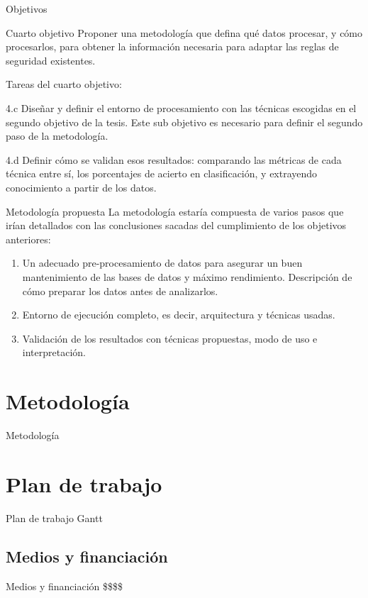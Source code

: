 \documentclass{beamer}
\begin{document}
\begin{frame}{Objetivos}

\begin{block}{Cuarto objetivo}
Proponer una metodología que defina qué datos procesar, y cómo procesarlos, para obtener la información necesaria para adaptar las reglas de seguridad existentes.
\end{block}

Tareas del cuarto objetivo:

\begin{description}
  \begin{small}
  \item[4.c] Diseñar y definir el entorno de procesamiento con las técnicas escogidas en el segundo objetivo de la tesis. Este sub objetivo es necesario para definir el segundo paso de la metodología.
  \item[4.d] Definir cómo se validan esos resultados: comparando las métricas de cada técnica entre sí, los porcentajes de acierto en clasificación, y extrayendo conocimiento a partir de los datos.
  \end{small}
\end{description}

\end{frame}

\begin{frame}{Metodología propuesta}
La metodología estaría compuesta de varios pasos que irían detallados con las conclusiones sacadas del cumplimiento de los objetivos anteriores:

\begin{enumerate}
  \item Un adecuado pre-procesamiento de datos para asegurar un buen mantenimiento de las bases de datos y máximo rendimiento. Descripción de cómo preparar los datos antes de analizarlos.
  \item Entorno de ejecución completo, es decir, arquitectura y técnicas usadas.
  \item Validación de los resultados con técnicas propuestas, modo de uso e interpretación.
\end{enumerate}

\end{frame}

\section{Metodología}

\begin{frame}{Metodología}

\end{frame}

\section{Plan de trabajo}

\begin{frame}{Plan de trabajo}
Gantt
\end{frame}

\subsection{Medios y financiación}

\begin{frame}{Medios y financiación}
\$\$\$\$
\end{frame}
\end{document}
